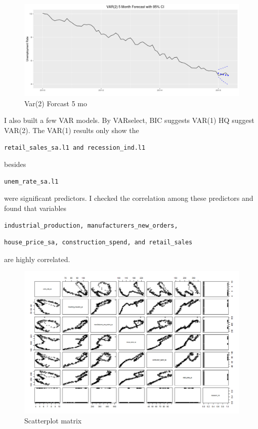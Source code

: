 \documentclass[twoside,twocolumn]{article}
\begin{document}
    \begin{figure}[H]
    	\centering
     	\caption{Var(2) Forcast 5 mo}
     	\includegraphics[width=\linewidth]{images/var25mo}
 \end{figure}
 
I also built a few VAR models. By VARselect, BIC suggests VAR(1) HQ suggest VAR(2). The VAR(1) results only show the \begin{verbatim}retail_sales_sa.l1 and recession_ind.l1\end{verbatim} besides \begin{verbatim}unem_rate_sa.l1\end{verbatim} were significant predictors. I checked the correlation among these predictors and found that variables \begin{verbatim}industrial_production, manufacturers_new_orders, \end{verbatim} \begin{verbatim}house_price_sa, construction_spend, and retail_sales\end{verbatim} are highly correlated.

    \begin{figure}[H]
    	\centering
     	\caption{Scatterplot matrix}
     	\includegraphics[width=\linewidth]{images/varcorrelation}
 \end{figure}
\end{document}
